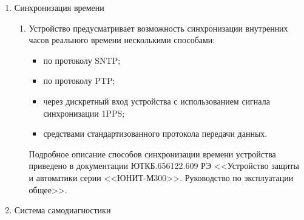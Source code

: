 \begin{enumerate}
\begin{enumerate}
\item В устройстве реализована поддержка режима тестирования <<Тест>> в объеме требований стандартов МЭК 61850. Режим тестирования предусмотрен для возможности оперативной проверки элементов/функций, таких как: ФСУ, измерительные органы, дискретные входы и выходные реле устройства.

\item  Особенности перевода устройства в режим тестирования и функциональности устройства в этом режиме описаны в документации ЮТКБ.656122.609 РЭ <<Устройство защиты и автоматики серии <<ЮНИТ-М300>>. Руководство по эксплуатации общее>>.

\end{enumerate}

\item Синхронизация времени
\begin{enumerate}

\item
Устройство предусматривает возможность синхронизации внутренних часов реального времени несколькими способами:
\begin{itemize}
\item по протоколу SNTP;
\item по протоколу PTP;
\item через дискретный вход устройства с использованием сигнала синхронизации 1PPS;
\item {средствами стандартизованного протокола передачи данных.}
\end{itemize}
Подробное описание способов синхронизации времени устройства приведено в документации ЮТКБ.656122.609 РЭ <<Устройство защиты и автоматики серии <<ЮНИТ-М300>>. Руководство по эксплуатации общее>>.

\end{enumerate}

\item Система самодиагностики
\begin{enumerate}


\end{enumerate}
\end{enumerate}
